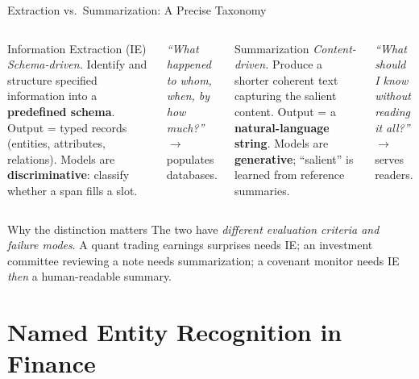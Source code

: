 \documentclass[9pt,t]{beamer}
\begin{document}
\begin{frame}{Extraction vs.\ Summarization: A Precise Taxonomy}
\begin{columns}[T]
\begin{block}{Information Extraction (IE)}
\emph{Schema-driven.} Identify and structure specified information into a
\textbf{predefined schema}. Output = typed records (entities, attributes,
relations). Models are \textbf{discriminative}: classify whether a span fills a slot.
\end{block}
\textit{``What happened to whom, when, by how much?''} $\to$ populates databases.

\begin{block}{Summarization}
\emph{Content-driven.} Produce a shorter coherent text capturing the salient
content. Output = a \textbf{natural-language string}. Models are
\textbf{generative}; ``salient'' is learned from reference summaries.
\end{block}
\textit{``What should I know without reading it all?''} $\to$ serves readers.
\end{columns}

\medskip
\begin{alertblock}{Why the distinction matters}
The two have \emph{different evaluation criteria and failure modes}. A quant trading
earnings surprises needs IE; an investment committee reviewing a note needs
summarization; a covenant monitor needs IE \emph{then} a human-readable summary.
\end{alertblock}
\end{frame}

\section{Named Entity Recognition in Finance}
\end{document}
